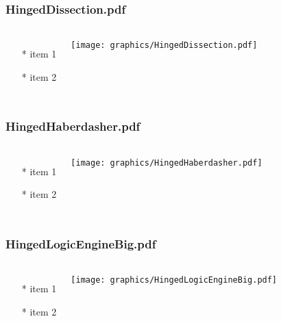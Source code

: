 \begin{frame} \frametitle{HingedDissection.pdf}
    \begin{columns}[c]
        \begin{itemize}
            \item[*] item 1
            \item[*] item 2
        \end{itemize}
        \begin{minipage}{\linewidth}
            \begin{center}
            \texttt{[image: graphics/HingedDissection.pdf]}
            \label{gfx:HingedDissection.pdf}
            \end{center}
        \end{minipage}
    \end{columns}
\end{frame}
\begin{frame} \frametitle{HingedHaberdasher.pdf}
    \begin{columns}[c]
        \begin{itemize}
            \item[*] item 1
            \item[*] item 2
        \end{itemize}
        \begin{minipage}{\linewidth}
            \begin{center}
            \texttt{[image: graphics/HingedHaberdasher.pdf]}
            \label{gfx:HingedHaberdasher.pdf}
            \end{center}
        \end{minipage}
    \end{columns}
\end{frame}
\begin{frame} \frametitle{HingedLogicEngineBig.pdf}
    \begin{columns}[c]
        \begin{itemize}
            \item[*] item 1
            \item[*] item 2
        \end{itemize}
        \begin{minipage}{\linewidth}
            \begin{center}
            \texttt{[image: graphics/HingedLogicEngineBig.pdf]}
            \label{gfx:HingedLogicEngineBig.pdf}
            \end{center}
        \end{minipage}
    \end{columns}
\end{frame}
